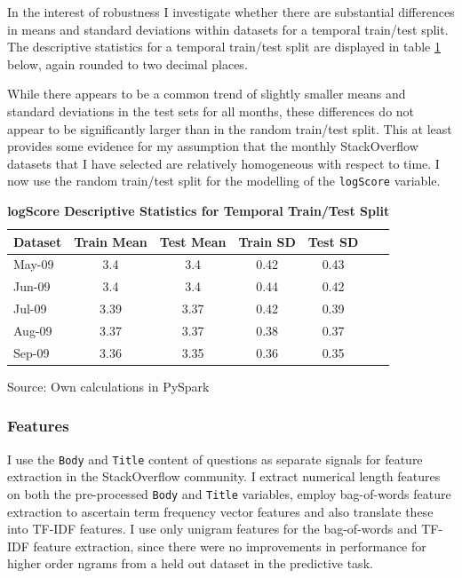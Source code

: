 \documentclass[11pt,preprint, authoryear]{article}
\begin{document}
\normalsize

In the interest of robustness I investigate whether there are
substantial differences in means and standard deviations within datasets
for a temporal train/test split. The descriptive statistics for a
temporal train/test split are displayed in table \ref{tab:time_tr_te}
below, again rounded to two decimal places.

While there appears to be a common trend of slightly smaller means and
standard deviations in the test sets for all months, these differences
do not appear to be significantly larger than in the random train/test
split. This at least provides some evidence for my assumption that the
monthly StackOverflow datasets that I have selected are relatively
homogeneous with respect to time. I now use the random train/test split
for the modelling of the \texttt{logScore} variable.

\footnotesize

\begin{longtable}[htbp] {@{} lcccccc @{}} 
\caption{\textbf{logScore Descriptive Statistics for Temporal Train/Test Split}} 
\label{tab:time_tr_te} \\
\toprule
\textbf{Dataset} &  \textbf{Train Mean} &  \textbf{Test Mean} &  \textbf{Train SD} &  \textbf{Test SD} \\
\midrule
May-09 & 3.4 & 3.4 & 0.42 & 0.43 \\
Jun-09 & 3.4 & 3.4 & 0.44 & 0.42 \\
Jul-09 & 3.39 & 3.37 & 0.42 & 0.39 \\
Aug-09 & 3.37 & 3.37 & 0.38 & 0.37 \\
Sep-09 & 3.36 & 3.35 & 0.36 & 0.35 \\
\bottomrule
\end{longtable}\begin{center} Source: Own calculations in PySpark\end{center}

\normalsize

\subsubsection{Features}\label{features}

I use the \texttt{Body} and \texttt{Title} content of questions as
separate signals for feature extraction in the StackOverflow community.
I extract numerical length features on both the pre-processed
\texttt{Body} and \texttt{Title} variables, employ bag-of-words feature
extraction to ascertain term frequency vector features and also
translate these into TF-IDF features. I use only unigram features for
the bag-of-words and TF-IDF feature extraction, since there were no
improvements in performance for higher order ngrams from a held out
dataset in the predictive task.
\end{document}
